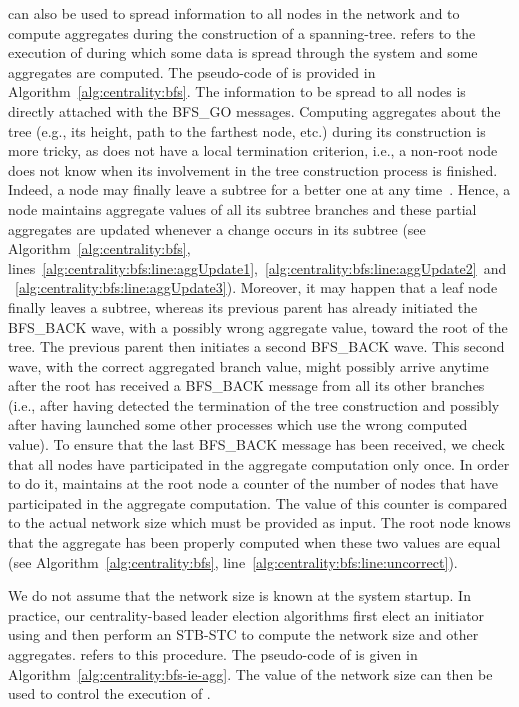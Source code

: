 \cheungCb{} can also be used to spread information to all nodes in the network and to compute aggregates during the construction of a spanning-tree. \cheungCbAgg{} refers to the execution of \cheungCb{} during which some data is spread through the system and some aggregates are computed. The pseudo-code of \cheungCbAgg{} is provided in Algorithm~\ref{alg:centrality:bfs}. The information to be spread to all nodes is directly attached with the BFS\_GO messages. Computing aggregates about the tree (e.g., its height, path to the farthest node, etc.) during its construction is more tricky, as \cheungCb{} does not have a local termination criterion, i.e., a non-root node does not know when its involvement in the tree construction process is finished. Indeed, a node may finally leave a subtree for a better one at any time~\cite{raynal2013distributed}. Hence, a node maintains aggregate values of all its subtree branches and these partial aggregates are updated whenever a change occurs in its subtree (see Algorithm~\ref{alg:centrality:bfs}, lines~\ref{alg:centrality:bfs:line:aggUpdate1},~\ref{alg:centrality:bfs:line:aggUpdate2}~and~\ref{alg:centrality:bfs:line:aggUpdate3}). Moreover, it may happen that a leaf node finally leaves a subtree, whereas its previous parent has already initiated the BFS\_BACK wave, with a possibly wrong aggregate value, toward the root of the tree. The previous parent then initiates a second BFS\_BACK wave. This second wave, with the correct aggregated branch value, might possibly arrive anytime after the root has received a BFS\_BACK message from all its other branches (i.e., after having detected the termination of the tree construction and possibly after having launched some other processes which use the wrong computed value). To ensure that the last BFS\_BACK message has been received, we check that all nodes have participated in the aggregate computation only once. In order to do it, \cheungCb{} maintains at the root node a counter of the number of nodes that have participated in the aggregate computation. The value of this counter is compared to the actual network size which must be provided as input. The root node knows that the aggregate has been properly computed when these two values are equal (see Algorithm~\ref{alg:centrality:bfs}, line~\ref{alg:centrality:bfs:line:uncorrect}).

We do not assume that the network size is known at the system startup. In practice, our centrality-based leader election algorithms first elect an initiator using \cheungIeCb{} and then perform an STB-STC to compute the network size and other aggregates. \cheungIeCbAgg{} refers to this procedure. The pseudo-code of \cheungIeCbAgg{} is given in Algorithm~\ref{alg:centrality:bfs-ie-agg}. The value of the network size can then be used to control the execution of \cheungCb{}.

